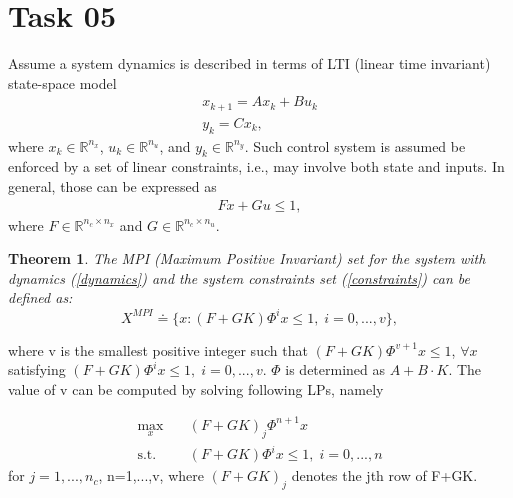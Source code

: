 \documentclass[12pt]{article}%
\newtheorem{theorem}{Theorem}
\begin{document}
\section{Task 05}
Assume a system dynamics is described in terms of LTI (linear time invariant) state-space model 
\begin{equation} \label{dynamics}
   \begin{aligned}
    x_{k+1} = Ax_k + Bu_k \\
    y_k = Cx_k,
   \end{aligned}
\end{equation} where $x_k \in \mathbb{R}^{n_x}$, $u_k \in \mathbb{R}^{n_u}$, and $y_k \in \mathbb{R}^{n_y}$. Such control system is assumed be enforced by a set of linear constraints, i.e., may involve both state and inputs. In general, those can be expressed as 
\begin{equation}\label{constraints}
    \begin{aligned}
        Fx + Gu \leq 1,
    \end{aligned}
\end{equation} where $F \in \mathbb{R}^{n_c\times n_x}$ and $ G \in \mathbb{R}^{n_c\times n_u}$. 

\begin{theorem}
     The MPI (Maximum Positive Invariant) set for the system with dynamics (\ref{dynamics}) and the system constraints set (\ref{constraints}) can be defined as:
     \begin{equation}
         X^{MPI} \doteq \{ x: (F+GK)\Phi^ix\leq1, \; i=0,...,v\} ,
     \end{equation}
\end{theorem} where v is the smallest positive integer such that $(F+GK)\Phi^{v+1}x \leq 1$, $\forall x$ satisfying $(F+GK)\Phi^ix \leq 1, \; i=0,...,v$. $\Phi$ is determined as $A + B\cdot K$. The value of v can be computed by solving following LPs, namely 

\begin{equation}\label{max_volume}
\begin{aligned}
\max_{x} \quad & (F+GK)_j\Phi^{n+1}x\\
\textrm{s.t.} \quad & (F+GK)\Phi^ix \leq 1, \; i=0,...,n
\end{aligned}
\end{equation} for $j=1,...,n_c$, n=1,...,v, where $(F+GK)_j$ denotes the jth row of F+GK. 
\end{document}

